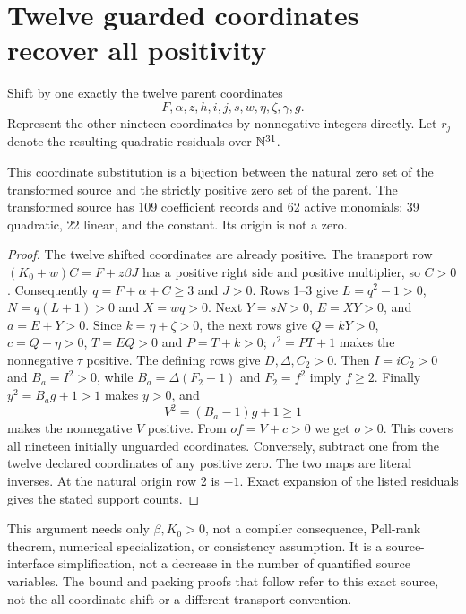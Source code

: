 \section{Twelve guarded coordinates recover all positivity}
Shift by one exactly the twelve parent coordinates
\[
 F,\alpha,z,h,i,j,s,w,\eta,\zeta,\gamma,g.
\]
Represent the other nineteen coordinates by nonnegative integers directly.
Let $r_j$ denote the resulting quadratic residuals over $\mathbb N^{31}$.

\begin{proposition}
This coordinate substitution is a bijection between the natural zero set
of the transformed source and the strictly positive zero set of the parent.
The transformed source has 109 coefficient records and 62 active monomials:
39 quadratic, 22 linear, and the constant. Its origin is not a zero.
\end{proposition}
\begin{proof}
The twelve shifted coordinates are already positive. The transport row
$(K_0+w)C=F+z\beta J$ has a positive right side and positive multiplier,
so $C>0$. Consequently $q=F+\alpha+C\ge3$ and $J>0$.
Rows 1--3 give $L=q^2-1>0$, $N=q(L+1)>0$ and $X=wq>0$.
Next $Y=sN>0$, $E=XY>0$, and $a=E+Y>0$.
Since $k=\eta+\zeta>0$, the next rows give $Q=kY>0$,
$c=Q+\eta>0$, $T=EQ>0$ and $P=T+k>0$;
$\tau^2=PT+1$ makes the nonnegative $\tau$ positive.
The defining rows give $D,\Delta,C_2>0$.
Then $I=iC_2>0$ and $B_a=I^2>0$, while
$B_a=\Delta(F_2-1)$ and $F_2=f^2$ imply $f\ge2$.
Finally $y^2=B_ag+1>1$ makes $y>0$, and
\[
 V^2=(B_a-1)g+1\ge1
\]
makes the nonnegative $V$ positive. From $of=V+c>0$ we get $o>0$.
This covers all nineteen initially unguarded coordinates. Conversely,
subtract one from the twelve declared coordinates of any positive zero.
The two maps are literal inverses. At the natural origin row 2 is $-1$.
Exact expansion of the listed residuals gives the stated support counts.
\end{proof}
This argument needs only $\beta,K_0>0$, not a compiler consequence,
Pell-rank theorem, numerical specialization, or consistency assumption.
It is a source-interface simplification, not a decrease in the number of
quantified source variables. The bound and packing proofs that follow
refer to this exact source, not the all-coordinate shift or a different
transport convention.
